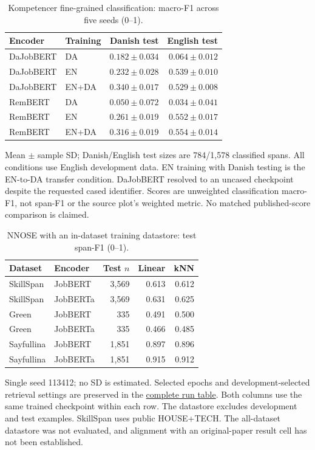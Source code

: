 \begin{table}[htbp]
\centering\small
\caption{Kompetencer fine-grained classification: macro-F1 across five seeds (0--1).}
\label{tab:external-kompetencer-classification}
\begin{tabularx}{\linewidth}{@{}L P{.18\linewidth}rr@{}}
\toprule
Encoder & Training & Danish test & English test \\
\midrule
DaJobBERT & DA & $0.182\pm0.034$ & $0.064\pm0.012$ \\
DaJobBERT & EN & $0.232\pm0.028$ & $0.539\pm0.010$ \\
DaJobBERT & EN+DA & $0.340\pm0.017$ & $0.529\pm0.008$ \\
RemBERT & DA & $0.050\pm0.072$ & $0.034\pm0.041$ \\
RemBERT & EN & $0.261\pm0.019$ & $0.552\pm0.017$ \\
RemBERT & EN+DA & $0.316\pm0.019$ & $0.554\pm0.014$ \\
\bottomrule
\end{tabularx}
\par\smallskip\RaggedRight\footnotesize Mean $\pm$ sample SD; Danish/English test sizes are 784/1,578 classified spans. All conditions use English development data. EN training with Danish testing is the EN-to-DA transfer condition. DaJobBERT resolved to an uncased checkpoint despite the requested cased identifier. Scores are unweighted classification macro-F1, not span-F1 or the source plot's weighted metric. No matched published-score comparison is claimed.
\end{table}

\begin{table}[htbp]
\centering\small
\caption{NNOSE with an in-dataset training datastore: test span-F1 (0--1).}
\label{tab:external-nnose}
\begin{tabularx}{\linewidth}{@{}L P{.22\linewidth}rrr@{}}
\toprule
Dataset & Encoder & Test $n$ & Linear & kNN \\
\midrule
SkillSpan & JobBERT & 3,569 & 0.613 & 0.612 \\
SkillSpan & JobBERTa & 3,569 & 0.631 & 0.625 \\
Green & JobBERT & 335 & 0.491 & 0.500 \\
Green & JobBERTa & 335 & 0.466 & 0.485 \\
Sayfullina & JobBERT & 1,851 & 0.897 & 0.896 \\
Sayfullina & JobBERTa & 1,851 & 0.915 & 0.912 \\
\bottomrule
\end{tabularx}
\par\smallskip\RaggedRight\footnotesize Single seed 113412; no SD is estimated. Selected epochs and development-selected retrieval settings are preserved in the \href{https://github.com/AlfredJamesLi/chinese-skillspan-benchmark/blob/1d1c24e20ee049fc768034b5baf58fa882e08e2c/reproduction/process_archive_20260924/secondary_review/tables/nnose_full.tex}{complete run table}. Both columns use the same trained checkpoint within each row. The datastore excludes development and test examples. SkillSpan uses public HOUSE+TECH. The all-dataset datastore was not evaluated, and alignment with an original-paper result cell has not been established.
\end{table}


